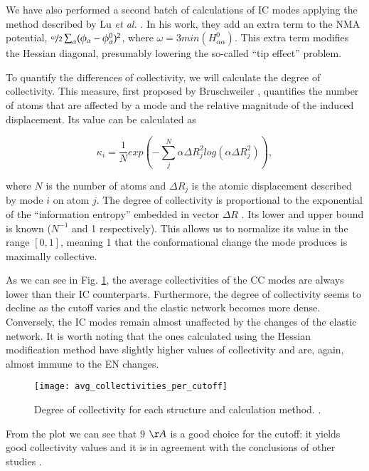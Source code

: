 We have also performed a second batch of calculations of IC modes applying the method described by Lu \textit{et al.} \cite{lu_new_2006}. In his work, they add an extra term to the NMA potential, $\nicefrac{\omega}{2} \sum_\alpha (\phi_\alpha - \phi_{\alpha}^0)^2$, where $\omega = 3 min(H_{\alpha\alpha}^0) $. This extra term modifies the Hessian diagonal, presumably lowering the so-called ``tip effect'' problem.

To quantify the differences of collectivity, we will calculate the degree of collectivity. This measure, first proposed by Bruschweiler \cite{bruschweiler_collective_1995}, quantifies the number of atoms that are affected by a mode and the relative magnitude of the induced displacement. Its value can be calculated as

\begin{equation}
\kappa_i = \frac{1}{N} exp \left( -\sum^N_j \alpha \Delta R_j^2 log \left( \alpha \Delta R_j^2 \right) \right),
\end{equation}

where $N$ is the number of atoms and $\Delta R_j$ is the atomic displacement described by mode $i$ on atom $j$. 
The degree of collectivity is proportional to the exponential of the ``information entropy'' embedded in vector $\Delta R$ \cite{tama_conformational_2001}. Its lower and upper bound is known ($N^{-1}$ and 1 respectively). This allows us to normalize its value in the range $[0,1]$, meaning 1 that the conformational change the mode produces is maximally collective.

As we can see in Fig. \ref{fig:collectivities_per_cutoff}, the average collectivities of the CC modes are always lower than their IC counterparts. Furthermore, the degree of collectivity seems to decline as the cutoff varies and the elastic network becomes more dense. Conversely, the IC modes remain almost unaffected by the changes of the elastic network. It is worth noting that the ones calculated using the Hessian modification method have slightly higher values of collectivity and are, again, almost immune to the EN changes. 

\begin{figure}
\texttt{[image: avg\_collectivities\_per\_cutoff]}
\caption{Degree of collectivity for each structure and calculation method. .}
\label{fig:collectivities_per_cutoff}
\end{figure}

From the plot we can see that 9 $\AA$ is a good choice for the cutoff: it yields good collectivity values and it is in agreement with the conclusions of other studies \cite{zheng_anharmonic_2010}.

